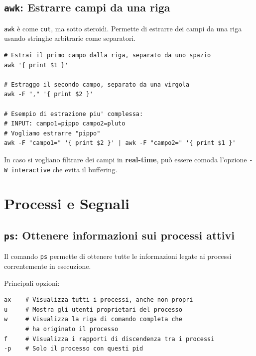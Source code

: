 \documentclass[a4paper]{report}
\newenvironment{info}{\begin{tcolorbox}[fonttitle=\sffamily\bfseries\large,title=Info,colframe=blue!75!white]}{\end{tcolorbox}}
\newenvironment{code}{\begin{tcolorbox}[size=small]}{\end{tcolorbox}}
\begin{document}
\section{\texttt{awk}: Estrarre campi da una riga}

\texttt{awk} è come \texttt{cut}, ma sotto steroidi. Permette di estrarre dei campi da una riga usando stringhe arbitrarie come separatori.

\begin{code}
\begin{lstlisting}
# Estrai il primo campo dalla riga, separato da uno spazio
awk '{ print $1 }'

# Estraggo il secondo campo, separato da una virgola
awk -F "," '{ print $2 }'

# Esempio di estrazione piu' complessa:
# INPUT: campo1=pippo campo2=pluto
# Vogliamo estrarre "pippo"
awk -F "campo1=" '{ print $2 }' | awk -F "campo2=" '{ print $1 }'
\end{lstlisting}
\end{code}

\begin{info}
	In caso si vogliano filtrare dei campi in \textbf{real-time}, può essere comoda l'opzione \texttt{-W interactive} che evita il buffering.
\end{info}

\chapter{Processi e Segnali}

\section{\texttt{ps}: Ottenere informazioni sui processi attivi}

Il comando \texttt{ps} permette di ottenere tutte le informazioni legate ai processi correntemente in esecuzione. 

Principali opzioni:

\begin{code}
\begin{lstlisting}
ax    # Visualizza tutti i processi, anche non propri
u     # Mostra gli utenti proprietari del processo
w     # Visualizza la riga di comando completa che
      # ha originato il processo
f     # Visualizza i rapporti di discendenza tra i processi
-p    # Solo il processo con questi pid
\end{lstlisting}
\end{code}
\end{document}
